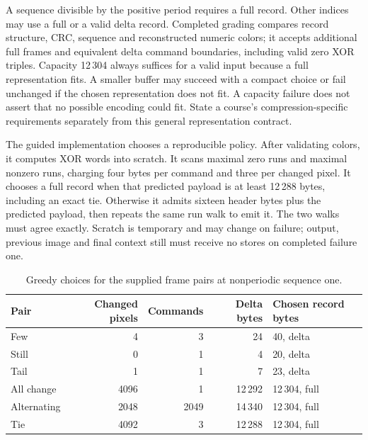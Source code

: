 A sequence divisible by the positive period requires a full record. Other indices
may use a full or a valid delta record. Completed grading compares record structure,
CRC, sequence and reconstructed numeric colors; it accepts additional full frames
and equivalent delta command boundaries, including valid zero XOR triples. Capacity
12\,304 always suffices for a valid input because a full representation fits.
A smaller buffer may succeed with a compact choice or fail unchanged if the chosen
representation does not fit. A capacity failure does not assert that no possible
encoding could fit. State a course's compression-specific requirements separately
from this general representation contract.

The guided implementation chooses a reproducible policy. After validating colors,
it computes XOR words into scratch. It scans maximal zero runs and maximal nonzero
runs, charging four bytes per command and three per changed pixel. It chooses a
full record when that predicted payload is at least 12\,288 bytes, including an
exact tie. Otherwise it admits sixteen header bytes plus the predicted payload,
then repeats the same run walk to emit it. The two walks must agree exactly.
Scratch is temporary and may change on failure; output, previous image and final
context still must receive no stores on completed failure one.

\begin{table}[htbp]
  \centering
  \caption{Greedy choices for the supplied frame pairs at nonperiodic sequence one.}
  \begin{tabular}{l r r r l}
    \toprule
    Pair        & Changed pixels & Commands & Delta bytes & Chosen record bytes \\
    \midrule
    Few         & 4              & 3        & 24          & 40, delta           \\
    Still       & 0              & 1        & 4           & 20, delta           \\
    Tail        & 1              & 1        & 7           & 23, delta           \\
    All change  & 4096           & 1        & 12\,292     & 12\,304, full       \\
    Alternating & 2048           & 2049     & 14\,340     & 12\,304, full       \\
    Tie         & 4092           & 3        & 12\,288     & 12\,304, full       \\
    \bottomrule
  \end{tabular}
\end{table}

